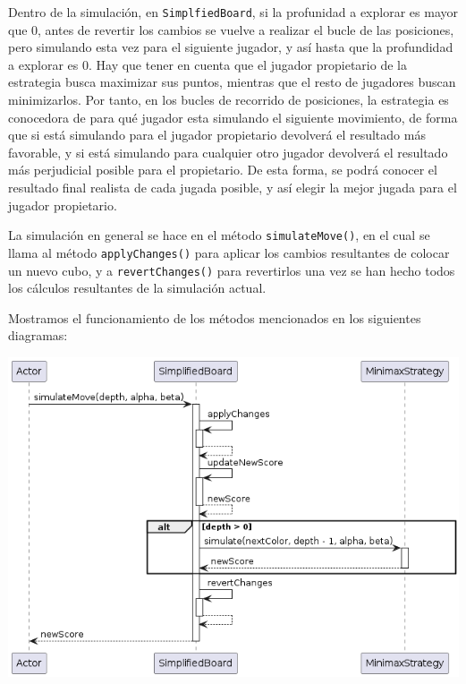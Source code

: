 \documentclass[12pt,a4paper,openright]{book}
\theoremstyle{break}
\begin{document}
Dentro de la simulación, en \texttt{SimplfiedBoard}, si la profunidad a explorar es mayor que 0, antes de revertir los cambios se vuelve a realizar el bucle de las posiciones, pero simulando esta vez para el siguiente jugador, y así hasta que la profundidad a explorar es 0. Hay que tener en cuenta que el jugador propietario de la estrategia busca maximizar sus puntos, mientras que el resto de jugadores buscan minimizarlos. Por tanto, en los bucles de recorrido de posiciones, la estrategia es conocedora de para qué jugador esta simulando el siguiente movimiento, de forma que si está simulando para el jugador propietario devolverá el resultado más favorable, y si está simulando para cualquier otro jugador devolverá el resultado más perjudicial posible para el propietario. De esta forma, se podrá conocer el resultado final realista de cada jugada posible, y así elegir la mejor jugada para el jugador propietario.

La simulación en general se hace en el método \texttt{simulateMove()}, en el cual se llama al método \texttt{applyChanges()} para aplicar los cambios resultantes de colocar un nuevo cubo, y a \texttt{revertChanges()} para revertirlos una vez se han hecho todos los cálculos resultantes de la simulación actual.

Mostramos el funcionamiento de los métodos mencionados en los siguientes diagramas:

\begin{center}
\includegraphics[scale=0.75]{SimplifiedBoard.simulateMove()-sprint7.png} 
\end{center}
\end{document}
